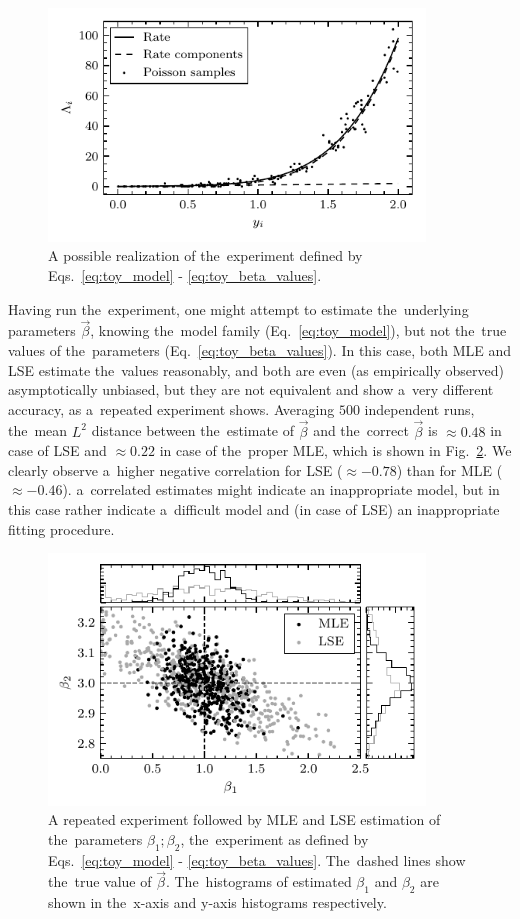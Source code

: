 \begin{figure}[ht]
 	\centering
 	\includegraphics[width=10cm]{figures/toy_model_curve.pdf}
 	\caption{A possible realization of the~experiment defined by Eqs.~\ref{eq:toy_model} - \ref{eq:toy_beta_values}.}
 	\label{fig:toy_model_curve}
\end{figure}

Having run the~experiment, one might attempt to estimate the~underlying parameters $\vec{\beta}$, knowing the~model family (Eq.~\ref{eq:toy_model}), but not the~true values of the~parameters (Eq.~\ref{eq:toy_beta_values}). In this case, both MLE and LSE estimate the~values reasonably, and both are even (as empirically observed) asymptotically unbiased, but they are not equivalent and show a~very different accuracy, as a~repeated experiment shows. Averaging $500$ independent runs, the~mean $L^2$ distance between the~estimate of $\vec{\beta}$ and the~correct $\vec{\beta}$ is $\approx 0.48$ in case of LSE and $\approx 0.22$ in case of the~proper MLE, which is shown in Fig.~\ref{fig:toy_model_draws}. We clearly observe a~higher negative correlation for LSE ($\approx -0.78 $) than for MLE ($\approx -0.46 $). a~correlated estimates might indicate an inappropriate model, but in this case rather indicate a~difficult model and (in case of LSE) an inappropriate fitting procedure.

\begin{figure}[ht]
 	\centering
 	\includegraphics[width=10cm]{figures/toy_model_draws.pdf}
 	\caption{A repeated experiment followed by MLE and LSE estimation of the~parameters $\beta_1; \beta_2$, the~experiment as defined by Eqs.~\ref{eq:toy_model} - \ref{eq:toy_beta_values}. The~dashed lines show the~true value of $\vec{\beta}$. The~histograms of estimated $\beta_1$ and $\beta_2$ are shown in the~x-axis and y-axis histograms respectively.}
 	\label{fig:toy_model_draws}
\end{figure}

